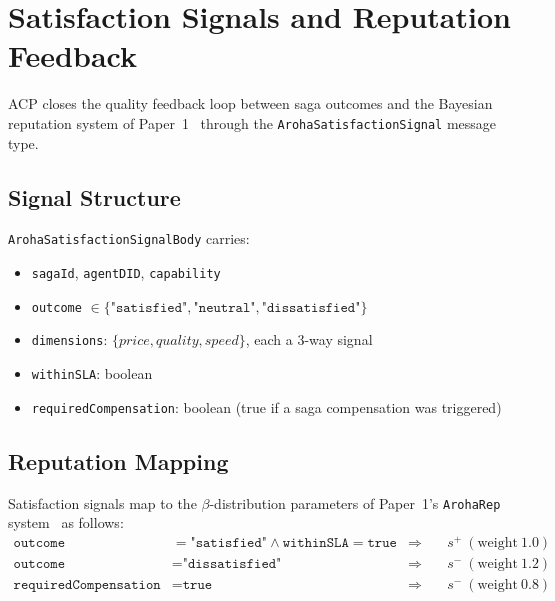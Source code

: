 \documentclass[conference]{IEEEtran}
\begin{document}
\section{Satisfaction Signals and Reputation Feedback}
\label{sec:satisfaction}

ACP closes the quality feedback loop between saga outcomes and the
Bayesian reputation system of Paper~1~\cite{aroha2025p1} through
the \texttt{ArohaSatisfactionSignal} message type.

\subsection{Signal Structure}

\texttt{ArohaSatisfactionSignalBody} carries:
\begin{itemize}
  \item \texttt{sagaId}, \texttt{agentDID}, \texttt{capability}
  \item \texttt{outcome} $\in \{\texttt{"satisfied"},
        \texttt{"neutral"}, \texttt{"dissatisfied"}\}$
  \item \texttt{dimensions}: $\{\textit{price}, \textit{quality},
        \textit{speed}\}$, each a 3-way signal
  \item \texttt{withinSLA}: boolean
  \item \texttt{requiredCompensation}: boolean (true if a saga
        compensation was triggered)
\end{itemize}

\subsection{Reputation Mapping}

Satisfaction signals map to the $\beta$-distribution parameters
of Paper~1's \texttt{ArohaRep} system~\cite{josang2002beta} as follows:
\begin{align*}
  \texttt{outcome}&=\texttt{"satisfied"} \wedge
    \texttt{withinSLA}=\texttt{true}
    &\Rightarrow&\quad s^{+}\ (\text{weight}\ 1.0) \\
  \texttt{outcome}&=\texttt{"dissatisfied"}
    &\Rightarrow&\quad s^{-}\ (\text{weight}\ 1.2) \\
  \texttt{requiredCompensation}&=\texttt{true}
    &\Rightarrow&\quad s^{-}\ (\text{weight}\ 0.8)
\end{align*}
\end{document}
